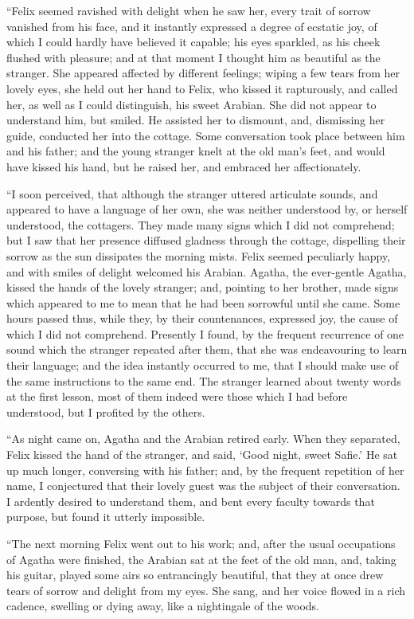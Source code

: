 ``Felix seemed ravished with delight
when he saw her, every trait
of sorrow vanished from his face,
and it instantly expressed a degree
of ecstatic joy, of which I could hardly
have believed it capable; his eyes
sparkled, as his cheek flushed with
pleasure; and at that moment I thought
him as beautiful as the stranger. She
appeared affected by different feelings;
wiping a few tears from her lovely eyes,
she held out her hand to Felix, who
kissed it rapturously, and called her, as
well as I could distinguish, his sweet
Arabian. She did not appear to understand
him, but smiled. He assisted her
to dismount, and, dismissing her guide,
conducted her into the cottage. Some
conversation took place between him
and his father; and the young stranger
knelt at the old man's feet, and would
have kissed his hand, but he raised her,
and embraced her affectionately.

``I soon perceived, that although the
stranger uttered articulate sounds, and
appeared to have a language of her
own, she was neither understood by, or
herself understood, the cottagers. They
made many signs which I did not comprehend;
but I saw that her presence
diffused gladness through the cottage,
dispelling their sorrow as the sun dissipates
the morning mists. Felix seemed
peculiarly happy, and with smiles of
delight welcomed his Arabian. Agatha,
the ever-gentle Agatha, kissed the hands
of the lovely stranger; and, pointing to
her brother, made signs which appeared
to me to mean that he had been sorrowful
until she came. Some hours passed
thus, while they, by their countenances,
expressed joy, the cause of which I did
not comprehend. Presently I found, by
the frequent recurrence of one sound
which the stranger repeated after them,
that she was endeavouring to learn
their language; and the idea instantly
occurred to me, that I should make use
of the same instructions to the same
end. The stranger learned about
twenty words at the first lesson, most
of them indeed were those which I had
before understood, but I profited by the
others.

``As night came on, Agatha and the
Arabian retired early. When they separated,
Felix kissed the hand of the
stranger, and said, `Good night, sweet
Safie.' He sat up much longer, conversing
with his father; and, by the frequent
repetition of her name, I conjectured
that their lovely guest was the
subject of their conversation. I ardently
desired to understand them, and
bent every faculty towards that purpose,
but found it utterly impossible.

``The next morning Felix went out
to his work; and, after the usual
occupations of Agatha were finished, the
Arabian sat at the feet of the old man,
and, taking his guitar, played some airs
so entrancingly beautiful, that they at
once drew tears of sorrow and delight
from my eyes. She sang, and her voice
flowed in a rich cadence, swelling or
dying away, like a nightingale of the
woods.

